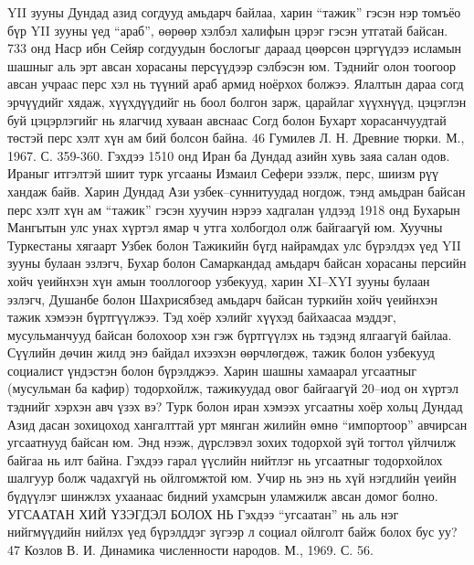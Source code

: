 YII зууны Дундад азид согдууд амьдарч байлаа, харин “тажик” гэсэн нэр томъёо бүр YII зууны үед “араб”, өөрөөр хэлбэл халифын цэрэг гэсэн утгатай байсан. 733 онд Наср ибн Сейяр согдуудын бослогыг дараад цөөрсөн цэргүүдээ исламын шашныг аль эрт авсан хорасаны персүүдээр сэлбэсэн юм. Тэднийг олон тоогоор авсан учраас перс хэл нь түүний араб армид ноёрхох болжээ. Ялалтын дараа согд эрчүүдийг хядаж, хүүхдүүдийг нь боол болгон зарж, царайлаг хүүхнүүд, цэцэглэн буй цэцэрлэгийг нь ялагчид хуваан авснаас Согд болон Бухарт хорасанчуудтай төстэй перс хэлт хүн ам бий болсон байна.
46 Гумилев Л. Н. Древние тюрки. М., 1967. С. 359-360.
Гэхдээ 1510 онд Иран ба Дундад азийн хувь заяа салан одов. Ираныг итгэлтэй шиит турк угсааны Измаил Сефери эзэлж, перс, шиизм рүү хандаж байв. Харин Дундад Ази узбек–суннитуудад ногдож, тэнд амьдран байсан перс хэлт хүн ам “тажик” гэсэн хуучин нэрээ хадгалан үлдээд 1918 онд Бухарын Мангытын улс унах хүртэл ямар ч утга холбогдол олж байгаагүй юм. Хуучны Туркестаны хягаарт Узбек болон Тажикийн бүгд найрамдах улс бүрэлдэх үед YII зууны булаан эзлэгч, Бухар болон Самаркандад амьдарч байсан хорасаны персийн хойч үеийнхэн хүн амын тооллогоор узбекууд, харин XI–XYI зууны булаан эзлэгч, Душанбе болон Шахрисябзед амьдарч байсан туркийн хойч үеийнхэн тажик хэмээн бүртгүүлжээ. Тэд хоёр хэлийг хүүхэд байхаасаа мэддэг, мусульманчууд байсан болохоор хэн гэж бүртгүүлэх нь тэдэнд ялгаагүй байлаа. Сүүлийн дөчин жилд энэ байдал ихээхэн өөрчлөгдөж, тажик болон узбекууд социалист үндэстэн болон бүрэлджээ. Харин шашны хамаарал угсаатныг (мусульман ба кафир) тодорхойлж, тажикуудад овог байгаагүй 20–иод он хүртэл тэднийг хэрхэн авч үзэх вэ? Турк болон иран хэмээх угсаатны хоёр хольц Дундад Азид дасан зохицоход хангалттай урт мянган жилийн өмнө “импортоор” авчирсан угсаатнууд байсан юм. Энд нээж, дүрслэвэл зохих тодорхой зүй тогтол үйлчилж байгаа нь илт байна. Гэхдээ гарал үүслийн нийтлэг нь угсаатныг тодорхойлох шалгуур болж чадахгүй нь ойлгомжтой юм. Учир нь энэ нь хүй нэгдлийн үеийн бүдүүлэг шинжлэх ухаанаас бидний ухамсрын уламжилж авсан домог болно.
УГСААТАН ХИЙ ҮЗЭГДЭЛ БОЛОХ НЬ
Гэхдээ “угсаатан” нь аль нэг нийгмүүдийн нийлэх үед бүрэлддэг зүгээр л социал ойлголт байж болох бус уу?
47 Козлов В. И. Динамика численности народов. М., 1969. С. 56.
